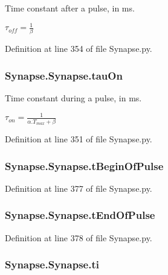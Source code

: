 Time constant after a pulse, in ms. 

$\tau_{off}=\frac{1}{\beta}$ 

Definition at line 354 of file Synapse.\-py.

\hypertarget{class_synapse_1_1_synapse_aae46f8edd1e94ea2ab51e3612afd3a3f}{
\subsubsection[{tau\-On}]{\setlength{\rightskip}{0pt plus 5cm}Synapse.\-Synapse.\-tau\-On}}\label{class_synapse_1_1_synapse_aae46f8edd1e94ea2ab51e3612afd3a3f}


Time constant during a pulse, in ms. 

$\tau_{on}=\frac{1}{\alpha.T_{max} +\beta}$ 

Definition at line 351 of file Synapse.\-py.

\hypertarget{class_synapse_1_1_synapse_acdc426c52a2a13183d5f8c54a830bfa2}{
\subsubsection[{t\-Begin\-Of\-Pulse}]{\setlength{\rightskip}{0pt plus 5cm}Synapse.\-Synapse.\-t\-Begin\-Of\-Pulse}}\label{class_synapse_1_1_synapse_acdc426c52a2a13183d5f8c54a830bfa2}


Definition at line 377 of file Synapse.\-py.

\hypertarget{class_synapse_1_1_synapse_adfd02fa815d45efd0cb1bc0124fe2c90}{
\subsubsection[{t\-End\-Of\-Pulse}]{\setlength{\rightskip}{0pt plus 5cm}Synapse.\-Synapse.\-t\-End\-Of\-Pulse}}\label{class_synapse_1_1_synapse_adfd02fa815d45efd0cb1bc0124fe2c90}


Definition at line 378 of file Synapse.\-py.

\hypertarget{class_synapse_1_1_synapse_a714c95723607acad52af96ad55b6c575}{
\subsubsection[{ti}]{\setlength{\rightskip}{0pt plus 5cm}Synapse.\-Synapse.\-ti}}\label{class_synapse_1_1_synapse_a714c95723607acad52af96ad55b6c575}


